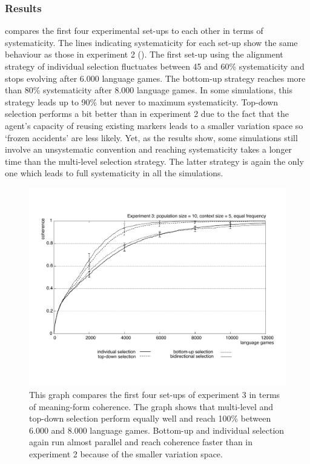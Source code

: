 \subsubsection{Results}
  compares the first four experimental set-ups to each other in terms of systematicity. The lines indicating systematicity for each set-up show the same behaviour as those in experiment 2 (). The first set-up using the alignment strategy of individual selection fluctuates between 45 and 60\% systematicity and stops evolving after 6.000 language games. The bottom-up strategy reaches more than 80\% systematicity after 8.000 language games. In some simulations, this strategy leads up to 90\% but never to maximum systematicity. Top-down selection performs a bit better than in experiment 2 due to the fact that the agent's capacity of reusing existing markers leads to a smaller variation space so `frozen accidents' are less likely. Yet, as the results show, some simulations still involve an unsystematic convention and reaching systematicity takes a longer time than the multi-level selection strategy. The latter strategy is again the only one which leads to full systematicity in all the simulations.

\begin{figure} 
\centerline{\includegraphics[width=\textwidth]{Chapter4/figs/coherence3}}
  \caption[Experiment 3: coherence]{This graph compares the first four set-ups of experiment 3 in terms of meaning-form coherence. The graph shows that multi-level and top-down selection perform equally well and reach 100\% between 6.000 and 8.000 language games. Bottom-up and individual selection again run almost parallel and reach coherence faster than in experiment 2 because of the smaller variation space.}
   \label{f:coherence3}
\end{figure}

